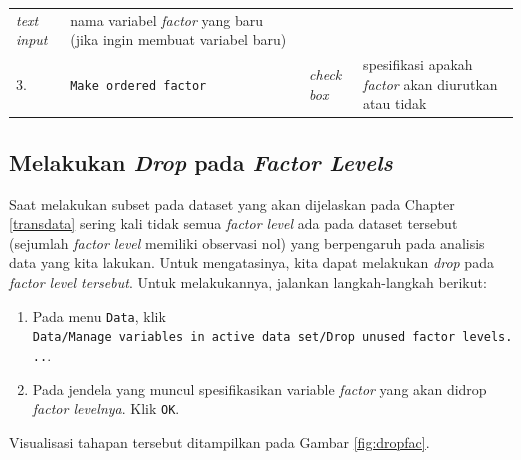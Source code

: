 \documentclass[12pt,]{krantz}
\providecommand{\tightlist}{%
  \setlength{\itemsep}{0pt}\setlength{\parskip}{0pt}}
\begin{document}
\begin{longtable}[]{@{}llll@{}}
\begin{minipage}[t]{0.09\columnwidth}
\emph{text input}\strut
\end{minipage} & \begin{minipage}[t]{0.61\columnwidth}\raggedright
nama variabel \emph{factor} yang baru (jika ingin membuat variabel baru)\strut
\end{minipage}\tabularnewline
\begin{minipage}[t]{0.04\columnwidth}\raggedright
3.\strut
\end{minipage} & \begin{minipage}[t]{0.14\columnwidth}\raggedright
\texttt{Make\ ordered\ factor}\strut
\end{minipage} & \begin{minipage}[t]{0.09\columnwidth}\raggedright
\emph{check box}\strut
\end{minipage} & \begin{minipage}[t]{0.61\columnwidth}\raggedright
spesifikasi apakah \emph{factor} akan diurutkan atau tidak\strut
\end{minipage}\tabularnewline
\bottomrule
\end{longtable}

\hypertarget{melakukan-drop-pada-factor-levels}{%
\subsection{\texorpdfstring{Melakukan \emph{Drop} pada \emph{Factor Levels}}{Melakukan Drop pada Factor Levels}}\label{melakukan-drop-pada-factor-levels}}

Saat melakukan subset pada dataset yang akan dijelaskan pada Chapter \ref{transdata} sering kali tidak semua \emph{factor level} ada pada dataset tersebut (sejumlah \emph{factor level} memiliki observasi nol) yang berpengaruh pada analisis data yang kita lakukan. Untuk mengatasinya, kita dapat melakukan \emph{drop} pada \emph{factor level tersebut}. Untuk melakukannya, jalankan langkah-langkah berikut:

\begin{enumerate}
\def\labelenumi{\arabic{enumi}.}
\tightlist
\item
  Pada menu \texttt{Data}, klik \texttt{Data/Manage\ variables\ in\ active\ data\ set/Drop\ unused\ factor\ levels...}.
\item
  Pada jendela yang muncul spesifikasikan variable \emph{factor} yang akan didrop \emph{factor levelnya}. Klik \texttt{OK}.
\end{enumerate}

Visualisasi tahapan tersebut ditampilkan pada Gambar \ref{fig:dropfac}.
\end{document}
